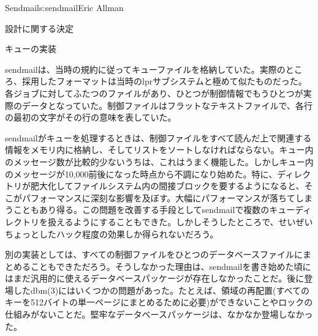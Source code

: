 \begin{aosachapter}{Sendmail}{s:sendmail}{Eric Allman}
\begin{aosasect1}{設計に関する決定}
\begin{aosasect2}{キューの実装}

sendmailは、当時の規約に従ってキューファイルを格納していた。実際のところ、採用したフォーマットは当時のlprサブシステムと極めて似たものだった。各ジョブに対してふたつのファイルがあり、ひとつが制御情報でもうひとつが実際のデータとなっていた。制御ファイルはフラットなテキストファイルで、各行の最初の文字がその行の意味を表していた。

sendmailがキューを処理するときは、制御ファイルをすべて読んだ上で関連する情報をメモリ内に格納し、そしてリストをソートしなければならない。キュー内のメッセージ数が比較的少ないうちは、これはうまく機能した。しかしキュー内のメッセージが10,000前後になった時点から不調になり始めた。特に、ディレクトリが肥大化してファイルシステム内の間接ブロックを要するようになると、そこがパフォーマンスに深刻な影響を及ぼす。大幅にパフォーマンスが落ちてしまうこともあり得る。この問題を改善する手段としてsendmailで複数のキューディレクトリを扱えるようにすることもできた。しかしそうしたところで、せいぜいちょっとしたハック程度の効果しか得られないだろう。

別の実装としては、すべての制御ファイルをひとつのデータベースファイルにまとめることもできただろう。そうしなかった理由は、sendmailを書き始めた頃にはまだ汎用的に使えるデータベースパッケージが存在しなかったことだ。後に登場したdbm(3)にはいくつかの問題があった。たとえば、領域の再配置(すべてのキーを512バイトの単一ページにまとめるために必要)ができないことやロックの仕組みがないことだ。堅牢なデータベースパッケージは、なかなか登場しなかった。


\end{aosasect2}
\end{aosasect1}
\end{aosachapter}
